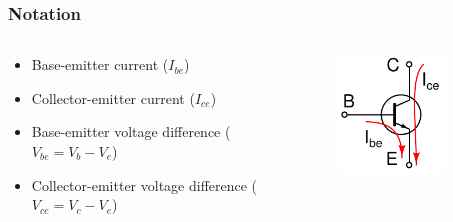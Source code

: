 \documentclass[beamer]{standalone}
\begin{document}
\begin{frame}
\frametitle{Notation}
\begin{columns}[t]
 \begin{column}{.65\textwidth}
  \begin{itemize}
   \item Base-emitter current ($I_{be}$)
   \item Collector-emitter current ($I_{ce}$)
   \item Base-emitter voltage difference ($V_{be}=V_b-V_e$)
   \item Collector-emitter voltage difference ($V_{ce}=V_c-V_e$)
  \end{itemize}
 \end{column}
 \begin{column}{.35\textwidth}
  \begin{figure}
   \includegraphics[width=0.80\textwidth]{./schematics/npn_transistor_with_currents.pdf}
  \end{figure}
 \end{column}
\end{columns}
\end{frame}
\end{document}

